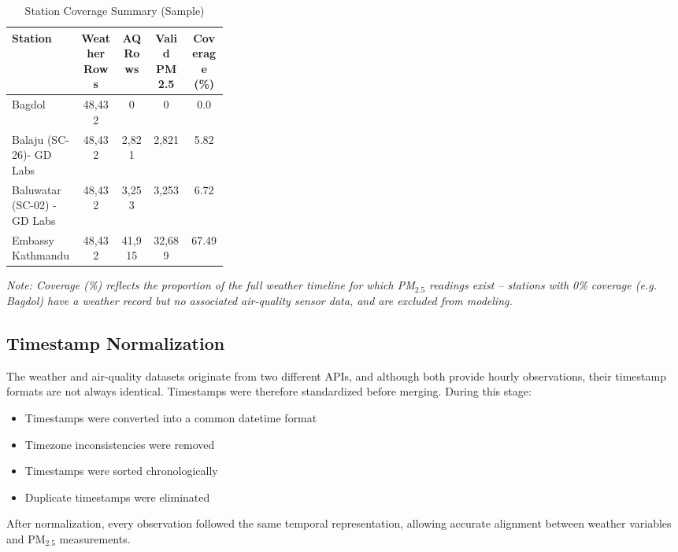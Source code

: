 \begin{table}[H]
    \centering
    \small
    \caption{Station Coverage Summary (Sample)}
    \label{tab:station_coverage_summary}
    \renewcommand{\arraystretch}{1.3}
    \begin{tabular}{|p{0.32\linewidth}|c|c|c|c|}
        \hline
        \textbf{Station} & \textbf{Weather Rows} & \textbf{AQ Rows} & \textbf{Valid PM2.5} & \textbf{Coverage (\%)} \\
        \hline
        Bagdol & 48,432 & 0 & 0 & 0.0 \\
        \hline
        Balaju (SC-26)- GD Labs & 48,432 & 2,821 & 2,821 & 5.82 \\
        \hline
        Baluwatar (SC-02) - GD Labs & 48,432 & 3,253 & 3,253 & 6.72 \\
        \hline
        Embassy Kathmandu & 48,432 & 41,915 & 32,689 & 67.49 \\
        \hline
    \end{tabular}
\end{table}

\textit{Note: Coverage (\%) reflects the proportion of the full weather timeline for
which PM$_{2.5}$ readings exist -- stations with 0\% coverage (e.g. Bagdol) have a
weather record but no associated air-quality sensor data, and are excluded from
modeling.}

\subsection{Timestamp Normalization}

The weather and air-quality datasets originate from two different APIs, and although
both provide hourly observations, their timestamp formats are not always identical.
Timestamps were therefore standardized before merging. During this stage:

\begin{itemize}
    \item Timestamps were converted into a common datetime format
    \item Timezone inconsistencies were removed
    \item Timestamps were sorted chronologically
    \item Duplicate timestamps were eliminated
\end{itemize}

After normalization, every observation followed the same temporal representation,
allowing accurate alignment between weather variables and PM$_{2.5}$ measurements.

